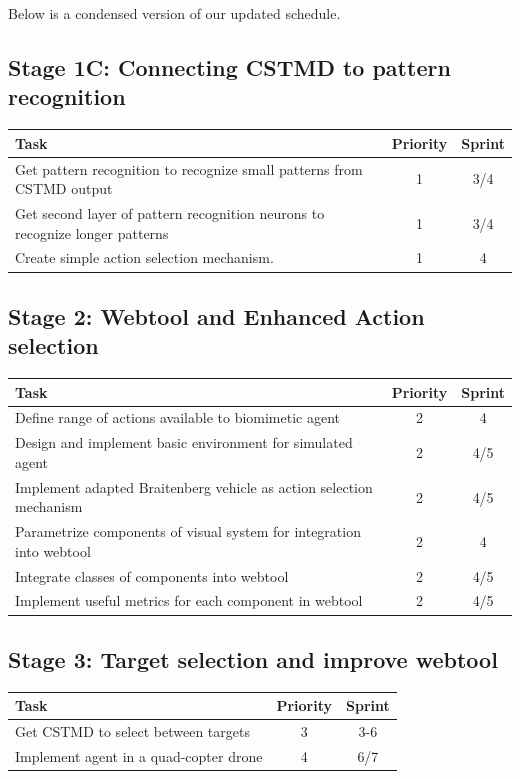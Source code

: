 \documentclass[a4paper,11pt]{article}
\begin{document}
Below is a condensed version of our updated schedule.

\subsection{Stage 1C: Connecting CSTMD to pattern recognition}
\begin{center}
    \begin{tabular}{p{12cm} c c}
    \textbf{Task} & \textbf{Priority} & \textbf{Sprint} \\ \hline
	Get pattern recognition to recognize small patterns from CSTMD output & 1 & 3/4 \\
	Get second layer of pattern recognition neurons to recognize longer patterns & 1 & 3/4\\
	Create simple action selection mechanism. & 1 & 4 \\
    \end{tabular}
\end{center}

\subsection{Stage 2: Webtool and Enhanced Action selection}
\begin{center}
    \begin{tabular}{p{12cm} c c}
    \textbf{Task} & \textbf{Priority} & \textbf{Sprint} \\ \hline
    Define range of actions available to biomimetic agent & 2 & 4 \\
    Design and implement basic environment for simulated agent & 2 & 4/5 \\
    Implement adapted Braitenberg vehicle as action selection mechanism & 2 & 4/5 \\
	Parametrize components of visual system for integration into webtool & 2 & 4 \\
	Integrate classes of components into webtool & 2 & 4/5 \\	
	Implement useful metrics for each component in webtool & 2 & 4/5 \\
    \end{tabular}
\end{center}

\subsection{Stage 3: Target selection and improve webtool}
\begin{center}
    \begin{tabular}{p{12cm} c c}
    \textbf{Task} & \textbf{Priority} & \textbf{Sprint} \\ \hline
    Get CSTMD to select between targets & 3 & 3-6 \\
    Implement agent in a quad-copter drone & 4 & 6/7 \\
    \end{tabular}
\end{center}
\end{document}
